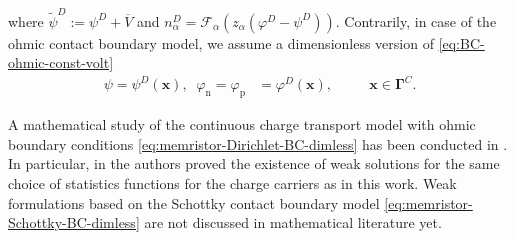\documentclass[10pt,a4paper, final]{article}
\def\electrons{\text{n}}
\def\holes{\text{p}}
\theoremstyle{definition}								%
\numberwithin{equation}{section}
\numberwithin{figure}{section}
\numberwithin{theorem}{section}
\begin{document}
where $\tilde{\psi}^D := \psi^D + \overline{V}$ and $n_\alpha^D = \mathcal{F}_\alpha ( z_\alpha (\varphi^D -\psi^D))$.
Contrarily, in case of the ohmic contact boundary model, we assume a dimensionless version of \eqref{eq:BC-ohmic-const-volt}
\begin{align} \label{eq:memristor-Dirichlet-BC-dimless}
    \psi = \psi^D(\mathbf{x}), \;\; \varphi_\electrons  = \varphi_\holes
        &= \varphi^D(\mathbf{x}), \quad
        &&\mathbf{x} \in \mathbf{\Gamma}^C.
\end{align}

A mathematical study of the continuous charge transport model with ohmic boundary conditions \eqref{eq:memristor-Dirichlet-BC-dimless} has been conducted in  \cite{Jourdana.2023, Jungel.2023, Herda.2024}.
In particular, in \cite{Herda.2024} the authors proved the existence of weak solutions for the same choice of statistics functions for the charge carriers as in this work.
Weak formulations based on the Schottky contact boundary model \eqref{eq:memristor-Schottky-BC-dimless} are not discussed in mathematical literature yet.


\end{document}
